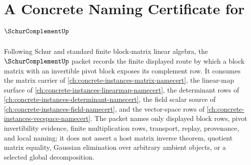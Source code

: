 \chapter{A Concrete Naming Certificate for $\SchurComplementUp$}
\label{ch:concrete-instances-schur-complement-namecert}

Following Schur and standard finite block-matrix linear algebra, the $\SchurComplementUp$ packet records the finite displayed route by which a block matrix with an invertible pivot block exposes its complement row. It consumes the matrix carrier of \autoref{ch:concrete-instances-matrix-namecert}, the linear-map surface of \autoref{ch:concrete-instances-linearmap-namecert}, the determinant rows of \autoref{ch:concrete-instances-determinant-namecert}, the field scalar source of \autoref{ch:concrete-instances-field-namecert}, and the vector-space rows of \autoref{ch:concrete-instances-vecspace-namecert}. The packet names only displayed block rows, pivot invertibility evidence, finite multiplication rows, transport, replay, provenance, and local naming; it does not assert a host matrix inverse theorem, quotient matrix equality, Gaussian elimination over arbitrary ambient objects, or a selected global decomposition.

